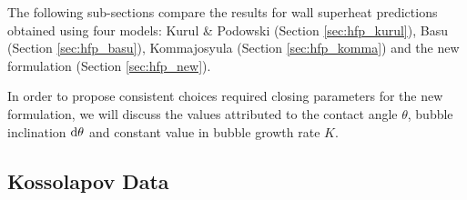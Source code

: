 \begin{table}[h!]


\noindent{}
\caption{Experimental data range of wall temperature measurements in the boiling region.}
\label{tab:exp_data_HFP}
\end{table}

\npar


The following sub-sections compare the results for wall superheat predictions obtained using four models: Kurul \& Podowski (Section \ref{sec:hfp_kurul}), Basu \etal (Section \ref{sec:hfp_basu}), Kommajosyula (Section \ref{sec:hfp_komma}) and the new formulation (Section \ref{sec:hfp_new}).

\npar

In order to propose consistent choices required closing parameters for the new formulation, we will discuss the values attributed to the contact angle $\theta$, bubble inclination $\mathrm{d}\theta$ and constant value in bubble growth rate $K$.


\subsection{Kossolapov Data}
\label{subsec:HFP_verif_koss}

